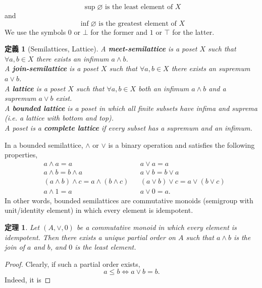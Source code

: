 \documentclass[a4j,12pt]{jarticle}
\numberwithin{equation}{section}
\newcommand{\itbf}[1]{\textit{\textbf{#1}}}
\newtheorem{thm}{定理}[section]
\newtheorem{dfn}{定義}[section]
\begin{document}
\begin{equation}
  \sup\varnothing \text{ is the least element of } X
\end{equation}
and
\begin{equation}
  \inf\varnothing \text{ is the greatest element of } X
\end{equation}
We use the symbols $0$ or $\bot$ for the former and $1$ or $\top$ for the latter.\\
\begin{dfn}[Semilattices, Lattice]
  A \itbf{meet-semilattice} is a poset $X$ such that $\forall a,b \in X$ there exists an infimum $a \wedge b$.\\
  A \itbf{join-semilattice} is a poset $X$ such that $\forall a,b \in X$ there exists an supremum $a \vee b$.\\
  A \itbf{lattice} is a poset $X$ such that $\forall a,b \in X$ both an infimum $a \wedge b$ and a supremum $a \vee b$ exist.\\
  A \itbf{bounded lattice} is a poset in which all finite subsets have infima and suprema (i.e. a lattice with bottom and top).\\
  A poset is a \itbf{complete lattice} if every subset has a supremum and an infimum.
\end{dfn}
In a bounded semilattice, $\wedge$ or $\vee$ is a binary operation and satisfies the following properties,
\begin{align}
  & a \wedge a = a && a \vee a = a\\
  & a \wedge b = b \wedge a &&  a \vee b = b \vee a \\
  & (a \wedge b) \wedge c = a \wedge (b \wedge c)  && (a \vee b) \vee c = a \vee (b \vee c) \\
  & a \wedge 1 = a && a \vee 0 = a.
\end{align}
In other words, bounded semilattices are commutative monoids (semigroup with unit/identity element) in which every element is idempotent.\\
\begin{thm}
  Let $(A, \vee, 0)$ be a commutative monoid in which every element is idempotent.
  Then there exists a unique partial order on $A$ such that $a \wedge b$ is the join of $a$ and $b$, and $0$ is the least element.
\end{thm}
\begin{proof}
  Clearly, if such a partial order exists,
  \begin{equation}
    a \le b \Leftrightarrow a \vee b = b.
  \end{equation}
  Indeed, it is 
\end{proof}
\end{document}

